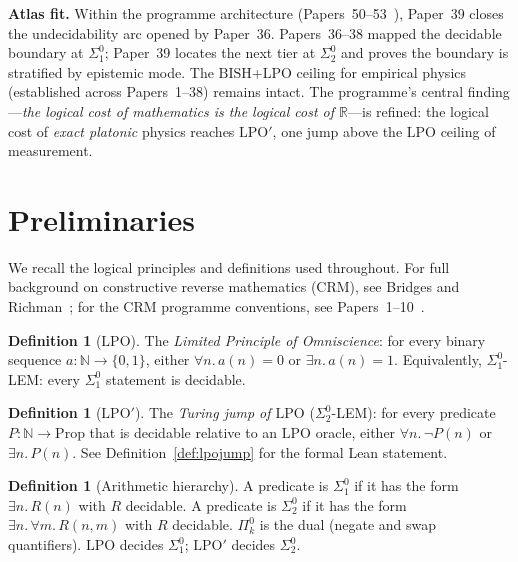 \documentclass[11pt,a4paper]{article}
\theoremstyle{plain}
\theoremstyle{definition}
\newtheorem{definition}[theorem]{Definition}
\newcommand{\NN}{\mathbb{N}}
\newcommand{\RR}{\mathbb{R}}
\newcommand{\LPO}{\ensuremath{\mathrm{LPO}}}
\newcommand{\LPOj}{\ensuremath{\mathrm{LPO'}}}
\newcommand{\BISH}{\ensuremath{\mathrm{BISH}}}
\begin{document}
\medskip\noindent
\textbf{Atlas fit.}
Within the programme architecture (Papers~50--53~\cite{Lee26P50}),
Paper~39 closes the undecidability arc opened by Paper~36.
Papers~36--38 mapped the decidable boundary at $\Sigma_1^0$;
Paper~39 locates the next tier at $\Sigma_2^0$ and proves
the boundary is stratified by epistemic mode.
The $\BISH$+$\LPO$ ceiling for empirical physics (established
across Papers~1--38) remains intact.
The programme's central finding---\emph{the logical cost of
mathematics is the logical cost of $\RR$}---is refined:
the logical cost of \emph{exact platonic} physics reaches
$\LPOj$, one jump above the $\LPO$ ceiling of measurement.

\section{Preliminaries}\label{sec:prelim}

We recall the logical principles and definitions used throughout.
For full background on constructive reverse mathematics (CRM),
see Bridges and Richman~\cite{BridgesRichman1987}; for the CRM
programme conventions, see Papers~1--10~\cite{Lee26P10}.

\begin{definition}[$\LPO$]
The \emph{Limited Principle of Omniscience}:
for every binary sequence $a : \NN \to \{0,1\}$,
either $\forall n.\, a(n) = 0$ or $\exists n.\, a(n) = 1$.
Equivalently, $\Sigma_1^0$-LEM: every $\Sigma_1^0$ statement
is decidable.
\end{definition}

\begin{definition}[$\LPOj$]
The \emph{Turing jump of $\LPO$} ($\Sigma_2^0$-LEM):
for every predicate $P : \NN \to \mathrm{Prop}$ that is
decidable relative to an $\LPO$ oracle, either
$\forall n.\, \lnot P(n)$ or $\exists n.\, P(n)$.
See Definition~\ref{def:lpojump} for the formal Lean statement.
\end{definition}

\begin{definition}[Arithmetic hierarchy]
A predicate is $\Sigma_1^0$ if it has the form
$\exists n.\, R(n)$ with $R$ decidable.
A predicate is $\Sigma_2^0$ if it has the form
$\exists n.\, \forall m.\, R(n,m)$ with $R$ decidable.
$\Pi_k^0$ is the dual (negate and swap quantifiers).
$\LPO$ decides $\Sigma_1^0$; $\LPOj$ decides $\Sigma_2^0$.
\end{definition}
\end{document}
